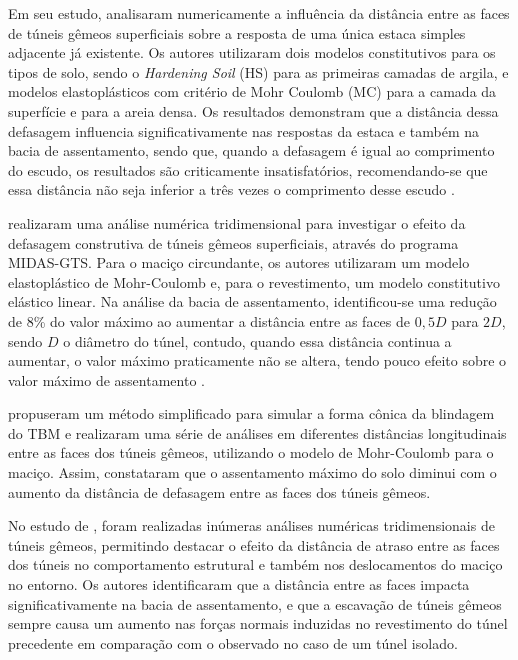 Em seu estudo,  analisaram numericamente a influência da distância entre as faces de túneis gêmeos superficiais sobre a resposta de uma única estaca simples adjacente já existente. Os autores utilizaram dois modelos constitutivos para os tipos de solo, sendo o \textit{Hardening Soil} (HS) para as primeiras camadas de argila, e modelos elastoplásticos com critério de Mohr Coulomb (MC) para a camada da superfície e para a areia densa. Os resultados demonstram que a distância dessa defasagem influencia significativamente nas respostas da estaca e também na bacia de assentamento, sendo que, quando a defasagem é igual ao comprimento do escudo, os resultados são criticamente insatisfatórios, recomendando-se que essa distância não seja inferior a três vezes o comprimento desse escudo \cite{Phutthananon2023}.

 realizaram uma análise numérica tridimensional para investigar o efeito da defasagem construtiva de túneis gêmeos superficiais, através do programa MIDAS-GTS. Para o maciço circundante, os autores utilizaram um modelo elastoplástico de Mohr-Coulomb e, para o revestimento, um modelo constitutivo elástico linear. Na análise da bacia de assentamento, identificou-se uma redução de 8\% do valor máximo ao aumentar a distância entre as faces de $0,5D$ para $2D$, sendo $D$ o diâmetro do túnel, contudo, quando essa distância continua a aumentar, o valor máximo praticamente não se altera, tendo pouco efeito sobre o valor máximo de assentamento \cite{Changguietal2020}. 

 propuseram um método simplificado para simular a forma cônica da blindagem do TBM e realizaram uma série de análises em diferentes distâncias longitudinais entre as faces dos túneis gêmeos, utilizando o modelo de Mohr-Coulomb para o maciço. Assim, constataram que o  assentamento máximo do solo diminui com o aumento da distância de defasagem entre as faces dos túneis gêmeos.

No estudo de , foram realizadas inúmeras análises numéricas tridimensionais de túneis gêmeos, permitindo destacar o efeito da distância de atraso entre as faces dos túneis no comportamento estrutural e também nos deslocamentos do maciço no entorno. Os autores identificaram que a distância entre as faces impacta significativamente na bacia de assentamento, e que a escavação de túneis gêmeos sempre causa um aumento nas forças normais induzidas no revestimento do túnel precedente em comparação com o observado no caso de um túnel isolado.
